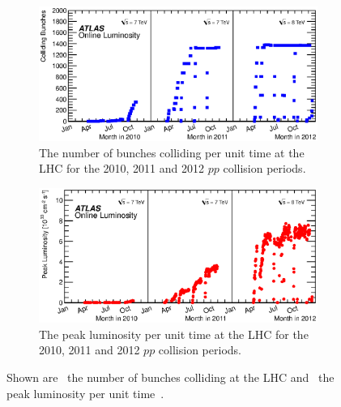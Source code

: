 \begin{figure}[htbp]
  \centering
    \begin{subfigure}[b]{0.95\textwidth}
      \includegraphics[width=\textwidth]{PartDetector/Plots/BunchesCollidingPerTime.eps}
      \caption{The number of bunches colliding per unit time at the LHC for the 2010, 2011 and 2012 $pp$ collision periods.}\label{fig:DetectorBunchesColliding}
    \end{subfigure}
  
    \begin{subfigure}[b]{0.95\textwidth}
      \includegraphics[width=\textwidth]{PartDetector/Plots/PeakLuminosityVsTime.eps}
      \caption{The peak luminosity per unit time at the LHC for the 2010, 2011 and 2012 $pp$ collision periods.}\label{fig:DetectorPeakLumi}
    \end{subfigure}
    \caption[Shown are the number of bunches colliding at the LHC and the peak luminosity per unit time.]{Shown are~ the number of bunches colliding at the LHC and~ the peak luminosity per unit time~\cite{Detector:LuminosityResults}.}\label{fig:DetectorPerformance}
\end{figure}

